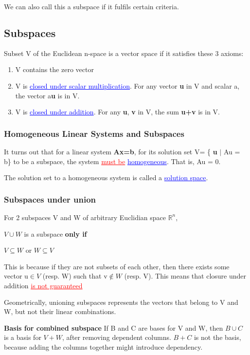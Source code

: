 \documentclass{article}
\newcommand{\bul}[1]{\textcolor{blue}{\underline{#1}}}
\newcommand{\rul}[1]{\textcolor{red}{\underline{#1}}}
\newcommand{\sub}[1]{\vspace{10pt}\textbf{#1}}
\newcommand{\sbreak}{\vspace{10pt}}
\begin{document}
\sbreak

We can also call this a subspace if it fulfils certain criteria.

\subsection{Subspaces}
Subset V of the Euclidean n-space is a vector space if it satisfies these 3 axioms:

\begin{enumerate}
    \item V contains the zero vector
    \item V is \bul{closed under scalar multiplication}. For any vector \textbf{u} in V and scalar a, the vector a\textbf{u} is in V.
    \item V is \bul{closed under addition}. For any \textbf{u}, \textbf{v} in V, the sum \textbf{u+v} is in V.
\end{enumerate}

\subsubsection{Homogeneous Linear Systems and Subspaces}
It turns out that for a linear system \textbf{Ax=b}, for its solution set \break V= \{ \textbf{u} $\mid$ Au = b\} to be a subspace, the system \rul{must be} \bul{homogeneous}. That is, Au = 0.

The solution set to a homogeneous system is called a \bul{solution space}.

\subsubsection{Subspaces under union}
For 2 subspaces V and W of arbitrary Euclidian space $\mathbb{R}^n$,

$V \cup W$ is a subspace \textbf{only if}
\begin{center}
    $V \subseteq W$ or $W \subseteq V$
\end{center}
This is because if they are not subsets of each other, then there exists some vector u$\in V$ (resp. W) such that v$\notin W$ (resp. V). This means that closure under addition \rul{is not guaranteed}

\sbreak

Geometrically, unioning subspaces represents the vectors that belong to V and W, but not their linear combinations.

\sub{Basis for combined subspace}
If B and C are bases for V and W, then $B \cup C$ is a basis for $V + W$, after removing dependent columns. $B + C$ is not the basis, because adding the columns together might introduce dependency.
\end{document}
